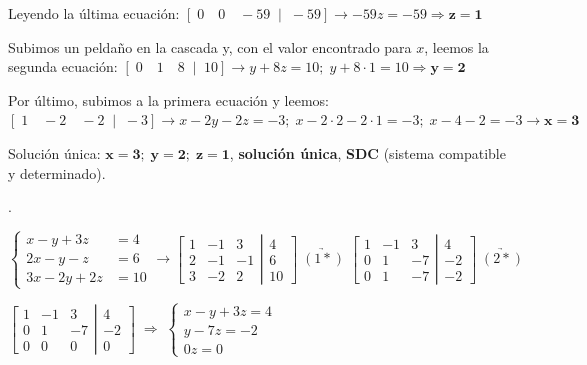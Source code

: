 \begin{ejem}
Leyendo la última ecuación: $[\; 0 \quad 0 \quad -59 \;\;  | \; \; -59 ] \to  -59z=-59 \Rightarrow \boldsymbol{z=1}$ 

Subimos un peldaño en la cascada y, con el valor encontrado para $x$, leemos la segunda ecuación: $[\; 0\quad 1 \quad 8 \; \; | \; \; 10] \to y+8z=10; \; y+8\cdot 1=10 \Rightarrow \boldsymbol{y=2}$

Por último, subimos a la primera ecuación y leemos: $[\; 1\quad -2\quad -2 \; \; | \; \; -3 ] \to x-2y-2z=-3 ; \; x -2\cdot 2-2\cdot 1=-3 ; \; x-4-2=-3 \rightarrow \boldsymbol{x=3}$

Solución única: $\boldsymbol{x=3;\;  y=2; \; z=1}$, \textbf{solución única}, \textbf{SDC} (sistema compatible y determinado).
\end{ejem}

\begin{ejem}.

$\begin{cases}
x-y+3z&=4\\2x-y-z&=6\\3x-2y+2z&=10	
\end{cases} \to \left[ \begin{matrix}
 1&-1&3\\2&-1&-1\\3&-2&2	
 \end{matrix}\right. 
 \left| \begin{matrix}
 4\\6\\10	
 \end{matrix}\right] \; \underrightarrow {(1*)} \;  
 \left[ \begin{matrix}
 1&-1&3\\0&1&-7\\0&1&-7	
 \end{matrix}\right. 
 \left| \begin{matrix}
 4\\-2\\-2	
 \end{matrix}\right] \; \underrightarrow {(2*)} \; $
 
 $
  \left[ \begin{matrix}
 1&-1&3\\0&1&-7\\ 0&0&0
 \end{matrix}\right. 
 \left| \begin{matrix}
 4\\-2\\0	
 \end{matrix}\right] \;  \Rightarrow  \; \begin{cases}
 x-y+3z=4\\ y-7z=-2\\0z=0	
 \end{cases}$
 

\end{ejem}
